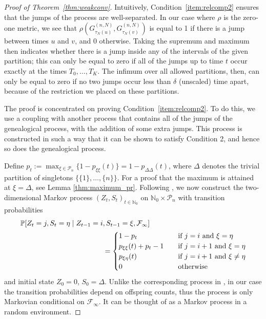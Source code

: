 \begin{proof}[Proof of Theorem~\ref{thm:weakconv}]
Intuitively, Condition~\ref{item:relcomp2} ensures that the jumps of the process are well-separated. 
In our case where $\rho$ is the zero-one metric, we see that $\rho( G_{\tau_N(u)}^{(n,N)}, G_{\tau_N(v)}^{(n,N)} )$ is equal to 1 if there is a jump between times $u$ and $v$, and 0 otherwise.
Taking the supremum and maximum then indicates whether there is a jump inside any of the intervals of the given partition; this can only be equal to zero if all of the jumps up to time $t$ occur exactly at the times $T_0, \dots, T_K$. 
The infimum over all allowed partitions, then, can only be equal to zero if no two jumps occur less than $\delta$ (unscaled) time apart, because of the restriction we placed on these partitions.

The proof is concentrated on proving Condition~\ref{item:relcomp2}.
To do this, we use a coupling with another process that contains all of the jumps of the genealogical process, with the addition of some extra jumps. This process is constructed in such a way that it can be shown to satisfy Condition 2, and hence so does the genealogical process.

Define $p_t := \max_{\xi\in \mathcal{P}_n} \{1 - p_{\xi\xi}(t)\} = 1 - p_{\Delta\Delta}(t)$, where $\Delta$ denotes the trivial partition of singletons $\{ \{1\},\dots, \{n\} \}$. For a proof that the maximum is attained at $\xi = \Delta$, see Lemma \ref{thm:maximum_pr}. 
Following \textcite{mohle1999}, we now construct the two-dimensional Markov process $(Z_t, S_t)_{t \in \mathbb{N}_0}$ on $\mathbb{N}_0 \times \mathcal{P}_n$ with transition probabilities
\begin{align*}
\mathbb{P}[ Z_t = j , S_t = \eta \mid Z_{t-1} = i&, S_{t-1} = \xi, \mathcal{F}_\infty] \\
&= \begin{cases}
1 - p_t &\quad \text{if } j=i \text{ and } \xi=\eta \\
p_{\xi\xi}(t) + p_t - 1  &\quad \text{if } j=i+1 \text{ and } \xi=\eta \\
p_{\xi\eta}(t) &\quad \text{if } j=i+1 \text{ and } \xi\neq\eta \\
0 &\quad \text{otherwise} 
\end{cases}
\end{align*}
and initial state $Z_0=0$, $S_0 = \Delta$.
Unlike the corresponding process in \textcite{mohle1999}, in our case the transition probabilities depend on offspring counts, thus the process is only Markovian conditional on $\mathcal{F}_\infty$. It can be thought of as a Markov process in a random environment.


\end{proof}

